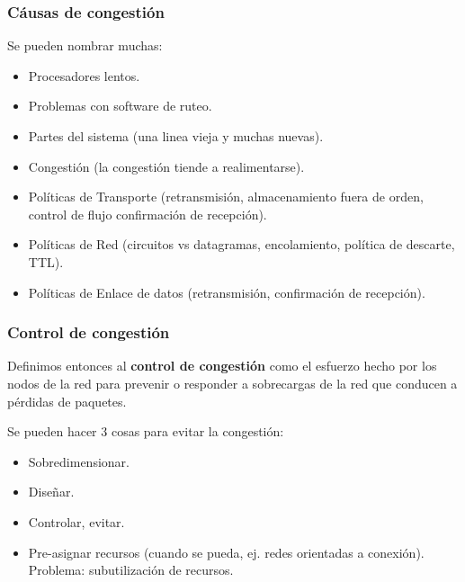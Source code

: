 \documentclass[]{article}
\begin{document}

\subsubsection{Cáusas de congestión}
Se pueden nombrar muchas:
\begin{itemize}
    \item Procesadores lentos.
    \item Problemas con software de ruteo.
    \item Partes del sistema (una linea vieja y muchas nuevas).
    \item Congestión (la congestión tiende a realimentarse).
    \item Políticas de Transporte (retransmisión, almacenamiento fuera de orden, control de flujo confirmación de recepción).
    \item Políticas de Red (circuitos vs datagramas, encolamiento, política de descarte, TTL).
    \item Políticas de Enlace de datos (retransmisión, confirmación de recepción).
\end{itemize}


\subsubsection{Control de congestión}
Definimos entonces al \textbf{control de congestión} como el esfuerzo hecho por los nodos de la red para prevenir o responder a sobrecargas de la red que conducen a pérdidas de paquetes.

Se pueden hacer 3 cosas para evitar la congestión:
\begin{itemize}
    \item Sobredimensionar.
    \item Diseñar.
    \item Controlar, evitar.
    \item Pre-asignar recursos (cuando se pueda, ej. redes orientadas a conexión). Problema: subutilización de recursos.
\end{itemize}
\end{document}
